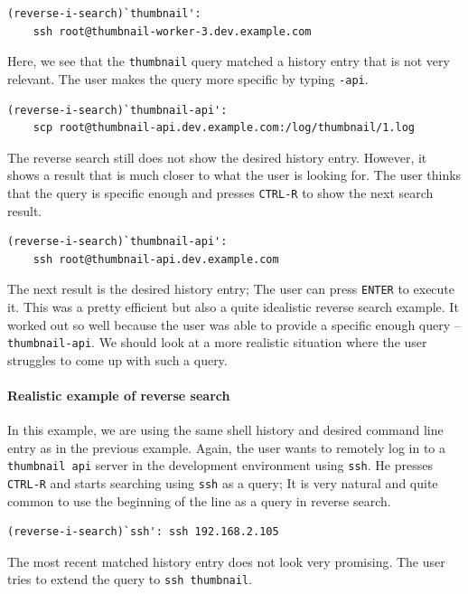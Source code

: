 \begin{verbatim}
(reverse-i-search)`thumbnail': 
    ssh root@thumbnail-worker-3.dev.example.com
\end{verbatim}

Here, we see that the \verb|thumbnail| query matched a history entry that is not very relevant. The user makes the query more specific by typing \verb|-api|.

\begin{verbatim}
(reverse-i-search)`thumbnail-api': 
    scp root@thumbnail-api.dev.example.com:/log/thumbnail/1.log
\end{verbatim}

The reverse search still does not show the desired history entry. However, it shows a result that is much closer to what the user is looking for. The user thinks that the query is specific enough and presses \verb|CTRL-R| to show the next search result.

\begin{verbatim}
(reverse-i-search)`thumbnail-api':
    ssh root@thumbnail-api.dev.example.com
\end{verbatim}

The next result is the desired history entry; The user can press \verb|ENTER| to execute it. This was a pretty efficient but also a quite idealistic reverse search example. It worked out so well because the user was able to provide a specific enough query -- \verb|thumbnail-api|. We should look at a more realistic situation where the user struggles to come up with such a query. 

\paragraph{Realistic example of reverse search}

In this example, we are using the same shell history and desired command line entry as in the previous example. Again, the user wants to remotely log in to a \verb|thumbnail api| server in the development environment using \verb|ssh|. He presses \verb|CTRL-R| and starts searching using \verb|ssh| as a query; It is very natural and quite common to use the beginning of the line as a query in reverse search.

\begin{verbatim}
(reverse-i-search)`ssh': ssh 192.168.2.105
\end{verbatim}

The most recent matched history entry does not look very promising. The user tries to extend the query to \verb|ssh thumbnail|.

